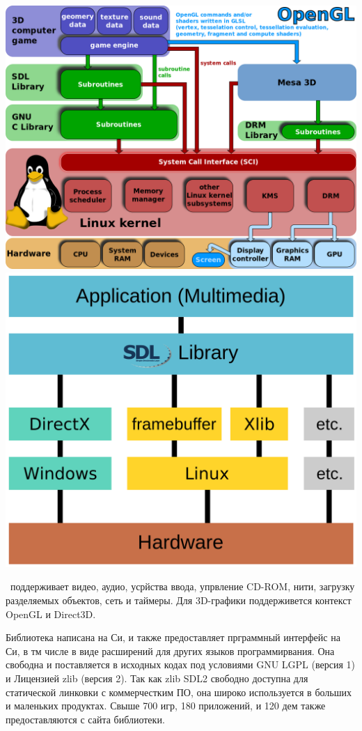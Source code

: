 {\begin{multicols}{2}
\noindent\includegraphics[width=\columnwidth]{01/SDLsheme1.png}
\columnbreak
\noindent\includegraphics[width=\columnwidth]{01/SDLsheme2.png}
\end{multicols}

\sdl\ поддерживает видео, аудио, усрйства ввода, упрвление CD-ROM, нити,
загрузку разделяемых объектов, сеть и таймеры. Для 3D-графики поддерживется
контекст OpenGL и Direct3D.

Библиотека написана на Си, и также предоставляет прграммный интерфейс на Си, в
тм числе в виде расширений для других языков программирвания.
Она свободна и поставляется в исходных кодах под условиями GNU LGPL (версия 1) и
Лицензией zlib (версия 2). Так как zlib SDL2 свободно доступна для статической
линковки с коммерчестким ПО, она широко используется в больших и маленьких
продуктах. Свыше 700 игр, 180 приложений, и 120 дем также предоставляются с
сайта библиотеки.

}
